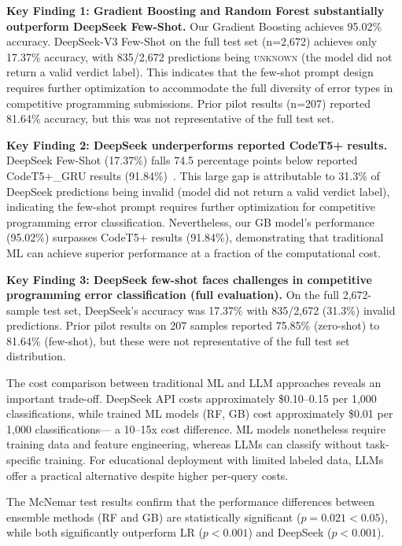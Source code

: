 \documentclass[10pt,letterpaper]{article}
\begin{document}
\textbf{Key Finding 1: Gradient Boosting and Random Forest substantially outperform DeepSeek Few-Shot.}
Our Gradient Boosting achieves 95.02\% accuracy. DeepSeek-V3 Few-Shot on the full test set (n=2,672) achieves only 17.37\% accuracy, with 835/2,672 predictions being \textsc{unknown} (the model did not return a valid verdict label). This indicates that the few-shot prompt design requires further optimization to accommodate the full diversity of error types in competitive programming submissions. Prior pilot results (n=207) reported 81.64\% accuracy, but this was not representative of the full test set.

\textbf{Key Finding 2: DeepSeek underperforms reported CodeT5+ results.}
DeepSeek Few-Shot (17.37\%) falls 74.5 percentage points below reported CodeT5+\_GRU results (91.84\%)~\cite{wang2023codet5plus}. This large gap is attributable to 31.3\% of DeepSeek predictions being invalid (model did not return a valid verdict label), indicating the few-shot prompt requires further optimization for competitive programming error classification. Nevertheless, our GB model's performance (95.02\%) surpasses CodeT5+ results (91.84\%), demonstrating that traditional ML can achieve superior performance at a fraction of the computational cost.

\textbf{Key Finding 3: DeepSeek few-shot faces challenges in competitive programming error classification (full evaluation).}
On the full 2,672-sample test set, DeepSeek's accuracy was 17.37\% with 835/2,672 (31.3\%) invalid predictions. Prior pilot results on 207 samples reported 75.85\% (zero-shot) to 81.64\% (few-shot), but these were not representative of the full test set distribution.

The cost comparison between traditional ML and LLM approaches reveals an important
trade-off. DeepSeek API costs approximately \$0.10--0.15 per 1,000 classifications,
while trained ML models (RF, GB) cost approximately \$0.01 per 1,000 classifications---
a 10--15x cost difference. ML models nonetheless require training data and feature engineering,
whereas LLMs can classify without task-specific training. For educational deployment with
limited labeled data, LLMs offer a practical alternative despite higher per-query costs.

The McNemar test results confirm that the performance differences between ensemble
methods (RF and GB) are statistically significant ($p = 0.021 < 0.05$), while both
significantly outperform LR ($p < 0.001$) and DeepSeek ($p < 0.001$).
\end{document}
